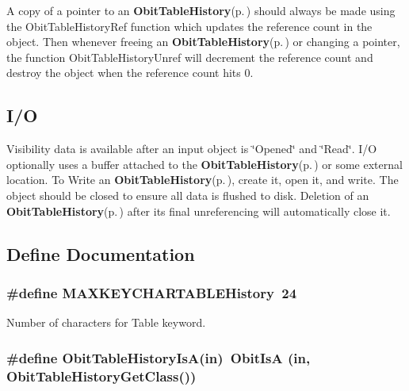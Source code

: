 A copy of a pointer to an {\bf Obit\-Table\-History}{\rm (p.\,\pageref{structObitTableHistory})} should always be made using the Obit\-Table\-History\-Ref function which updates the reference count in the object. Then whenever freeing an {\bf Obit\-Table\-History}{\rm (p.\,\pageref{structObitTableHistory})} or changing a pointer, the function Obit\-Table\-History\-Unref will decrement the reference count and destroy the object when the reference count hits 0.\subsection{I/O}\label{ObitTableHistory_8h_ObitTableHistoryUsage}
Visibility data is available after an input object is \char`\"{}Opened\char`\"{} and \char`\"{}Read\char`\"{}. I/O optionally uses a buffer attached to the {\bf Obit\-Table\-History}{\rm (p.\,\pageref{structObitTableHistory})} or some external location. To Write an {\bf Obit\-Table\-History}{\rm (p.\,\pageref{structObitTableHistory})}, create it, open it, and write. The object should be closed to ensure all data is flushed to disk. Deletion of an {\bf Obit\-Table\-History}{\rm (p.\,\pageref{structObitTableHistory})} after its final unreferencing will automatically close it.

\subsection{Define Documentation}
\subsubsection{\setlength{\rightskip}{0pt plus 5cm}\#define MAXKEYCHARTABLEHistory\ 24}\label{ObitTableHistory_8h_a0}


Number of characters for Table keyword. 

\subsubsection{\setlength{\rightskip}{0pt plus 5cm}\#define Obit\-Table\-History\-Is\-A(in)\ Obit\-Is\-A (in, Obit\-Table\-History\-Get\-Class())}\label{ObitTableHistory_8h_a3}


